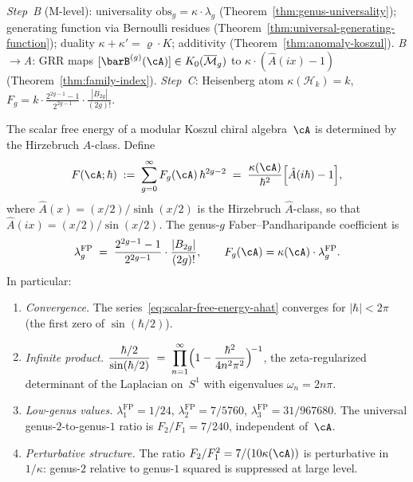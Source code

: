\begin{remark}
\label{rem:theorem-d-model}
\emph{Step~B} (M-level): universality
$\mathrm{obs}_g=\kappa\cdot\lambda_g$
(Theorem~\ref{thm:genus-universality}); generating function via
Bernoulli residues (Theorem~\ref{thm:universal-generating-function});
duality $\kappa+\kappa'=\varrho\cdot K$; additivity
(Theorem~\ref{thm:anomaly-koszul}).
\emph{B$\to$A}: GRR maps $[\barB^{(g)}(\cA)]\in K_0(\overline{\mathcal{M}}_g)$
to $\kappa\cdot(\hat{A}(ix)-1)$ (Theorem~\ref{thm:family-index}).
\emph{Step~C}: Heisenberg atom $\kappa(\mathcal{H}_k)=k$,
$F_g=k\cdot\frac{2^{2g-1}-1}{2^{2g-1}}\cdot\frac{|B_{2g}|}{(2g)!}$.
\end{remark}

\begin{corollary}
\label{cor:free-energy-ahat-genus}
The scalar free energy of a modular Koszul chiral
algebra~$\cA$ is determined by the Hirzebruch
$\hat{A}$-class.  Define
\begin{equation}\label{eq:scalar-free-energy-ahat}
F(\cA;\hbar)
\;:=\;
\sum_{g=0}^{\infty}
F_g(\cA)\,\hbar^{2g-2}
\;=\;
\frac{\kappa(\cA)}{\hbar^2}
\Bigl[\hat{A}(i\hbar) - 1\Bigr],
\end{equation}
where $\hat{A}(x) = (x/2)/\sinh(x/2)$ is the
Hirzebruch $\hat{A}$-class, so that
$\hat{A}(ix) = (x/2)/\sin(x/2)$.
The genus-$g$ Faber--Pandharipande coefficient is
\begin{equation}\label{eq:faber-pandharipande-coefficient}
\lambda_g^{\mathrm{FP}}
\;=\;
\frac{2^{2g-1}-1}{2^{2g-1}}\cdot
\frac{|B_{2g}|}{(2g)!},
\qquad
F_g(\cA) = \kappa(\cA)\cdot\lambda_g^{\mathrm{FP}}.
\end{equation}
In particular:
\begin{enumerate}[label=\textup{(\roman*)}]
\item \emph{Convergence.}
  The series~\eqref{eq:scalar-free-energy-ahat}
  converges for $|\hbar| < 2\pi$
  (the first zero of $\sin(\hbar/2)$).
\item \emph{Infinite product.}
  $\displaystyle
  \frac{\hbar/2}{\sin(\hbar/2)}
  \;=\;
  \prod_{n=1}^{\infty}
  \Bigl(1 - \frac{\hbar^2}{4n^2\pi^2}\Bigr)^{\!-1}$,
  the zeta-regularized determinant of the Laplacian
  on~$S^1$ with eigenvalues $\omega_n = 2n\pi$.
\item \emph{Low-genus values.}
  $\lambda_1^{\mathrm{FP}} = 1/24$, \;
  $\lambda_2^{\mathrm{FP}} = 7/5760$, \;
  $\lambda_3^{\mathrm{FP}} = 31/967680$.
  The universal genus-$2$-to-genus-$1$ ratio is
  $F_2/F_1 = 7/240$, independent of~$\cA$.
\item \emph{Perturbative structure.}
  The ratio
  $F_2/F_1^2 = 7/(10\kappa(\cA))$ is perturbative
  in $1/\kappa$: genus-$2$ relative to genus-$1$ squared
  is suppressed at large level.
\end{enumerate}
\end{corollary}

